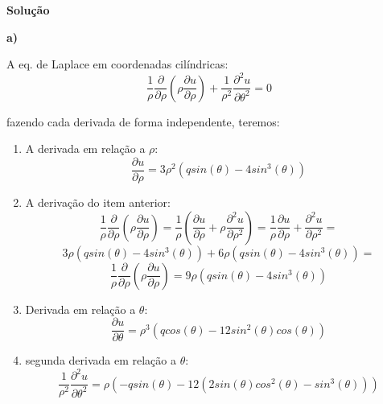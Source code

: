 \linespread{1.5}

\textbf{Solução}

\textbf{a)}

A eq. de Laplace em coordenadas cilíndricas:
\begin{equation*}
    \frac{1}{\rho}\frac{\partial }{\partial \rho}\left(\rho\frac{\partial u}{\partial \rho}\right) + \frac{1}{\rho^2}\frac{\partial^2 u}{\partial \theta^2} = 0
\end{equation*}

fazendo cada derivada de forma independente, teremos:
\begin{enumerate}[i]
    \item A derivada em relação a $\rho$:
    \begin{equation*}
        \frac{\partial u}{\partial \rho} = 3\rho^2(qsin(\theta) - 4sin^3(\theta))  
    \end{equation*}
    \item A derivação do item anterior:
    \begin{equation*}
        \frac{1}{\rho}\frac{\partial }{\partial \rho}\left(\rho\frac{\partial u}{\partial \rho}\right) = \frac{1}{\rho}\left(\frac{\partial u}{\partial \rho} + \rho\frac{\partial^2 u}{\partial \rho^2}\right) = \frac{1}{\rho}\frac{\partial u}{\partial \rho} + \frac{\partial^2 u}{\partial \rho^2} =
    \end{equation*}
    \begin{equation*}
        3\rho(qsin(\theta) - 4sin^3(\theta)) + 6\rho(qsin(\theta) - 4sin^3(\theta)) =
    \end{equation*}
    \begin{equation*}
        \boxed{ \frac{1}{\rho}\frac{\partial }{\partial \rho}\left(\rho\frac{\partial u}{\partial \rho}\right) = 9\rho(qsin(\theta) - 4sin^3(\theta)) }
    \end{equation*}
    \item Derivada em relação a $\theta$:
    \begin{equation*}
        \frac{\partial u}{\partial \theta} = \rho^3(qcos(\theta) - 12sin^2(\theta)cos(\theta))
    \end{equation*}
    \item segunda derivada em relação a $\theta$:
    \begin{equation*}
        \boxed{\frac{1}{\rho^2}\frac{\partial^2 u}{\partial \theta^2} = \rho(-qsin(\theta) - 12(2sin(\theta)cos^2(\theta) -sin^3(\theta)))}
    \end{equation*}
\end{enumerate}
   
